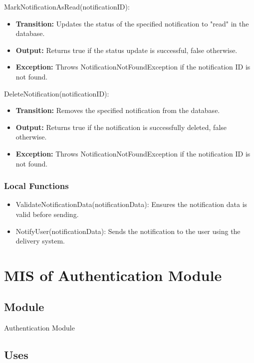 \documentclass[12pt, titlepage]{article}
\begin{document}
\noindent MarkNotificationAsRead(notificationID):
\begin{itemize}
    \item \textbf{Transition:} Updates the status of the specified notification to "read" in the database.
    \item \textbf{Output:} Returns true if the status update is successful, false otherwise.
    \item \textbf{Exception:} Throws NotificationNotFoundException if the notification ID is not found.
\end{itemize}

\noindent DeleteNotification(notificationID):
\begin{itemize}
    \item \textbf{Transition:} Removes the specified notification from the database.
    \item \textbf{Output:} Returns true if the notification is successfully deleted, false otherwise.
    \item \textbf{Exception:} Throws NotificationNotFoundException if the notification ID is not found.
\end{itemize}

\subsubsection{Local Functions}

\begin{itemize}
    \item ValidateNotificationData(notificationData): Ensures the notification data is valid before sending.
    \item NotifyUser(notificationData): Sends the notification to the user using the delivery system.
\end{itemize}

\newpage

\section{MIS of Authentication Module} \label{Module_Authentication}

\subsection{Module}

Authentication Module

\subsection{Uses}
\end{document}
